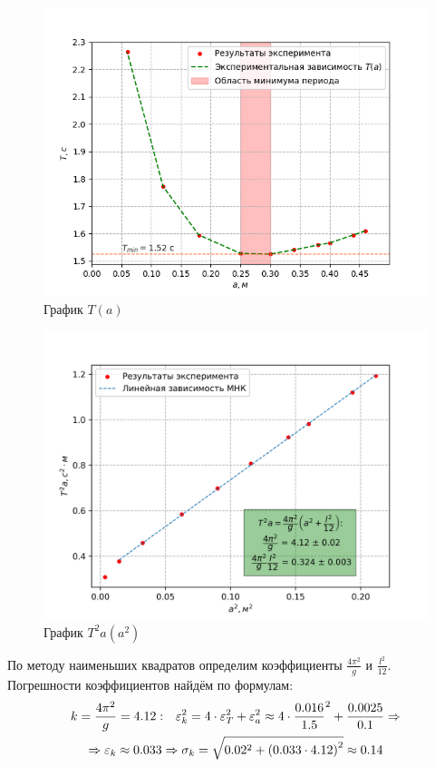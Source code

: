             \begin{figure}
                \centering
                \includegraphics[width=0.75\linewidth]{direct.png}
                \caption{График $T(a)$}
                \label{fig:direct}
            \end{figure}
            \begin{figure}
                \centering
                \includegraphics[width=0.75\linewidth]{linear.png}
               	\caption{График $T^2a\left(a^2\right)$}
               	\label{fig:linear}
            \end{figure}

            По методу наименьших квадратов определим коэффициенты $\frac{4\pi^2}{g}$ и $\frac{l^2}{12}$. Погрешности коэффициентов найдём по формулам:
            \begin{multline*}
                k = \frac{4\pi^2}{g} = 4.12: \hspace{0.25cm} \epsilon_k^2 = 4 \cdot \epsilon_T^2 + \epsilon_a^2 \approx 4 \cdot \frac{0.016}{1.5}^2 + \frac{0.0025}{0.1} \Rightarrow \\
                \Rightarrow \epsilon_k \approx 0.033 \Rightarrow \sigma_k = \sqrt{0.02^2 + \left(0.033 \cdot 4.12 \right)^2} \approx 0.14
            \end{multline*}
            
